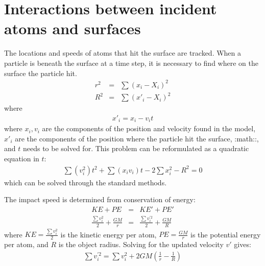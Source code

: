 \documentclass[letterpaper,10pt,english]{sphinxmanual}
\begin{document}
\section{Interactions between incident atoms and surfaces}
\label{\detokenize{nexoclom2/surface_interaction:interactions-between-incident-atoms-and-surfaces}}\label{\detokenize{nexoclom2/surface_interaction::doc}}
\sphinxAtStartPar
The locations and speeds of atoms that hit the surface are tracked. When a
particle is beneath the surface at a time step, it is necessary to find where
on the surface the particle hit.
\begin{equation*}
\begin{split}r^2 & = & \sum (x_i - X_i)^2 \\
R^2 & = & \sum (x'_i - X_i)^2\end{split}
\end{equation*}
\sphinxAtStartPar
where
\begin{equation*}
\begin{split}x'_i = x_i - v_i t\end{split}
\end{equation*}
\sphinxAtStartPar
where \(x_i, v_i\) are the components of the position and velocity found
in the model, \(x'_i\) are the components of the position where the
particle hit the surface, :math::, and \(t\) needs to be solved for. This problem
can be reformulated as a quadratic equation in \(t\):
\begin{equation*}
\begin{split}\sum(v_i^2) t^2 + \sum(x_i v_i)t - 2\sum x_i^2 - R^2 = 0\end{split}
\end{equation*}
\sphinxAtStartPar
which can be solved through the standard methods.

\sphinxAtStartPar
The impact speed is determined from conservation of energy:
\begin{equation*}
\begin{split}KE + PE & = & KE' + PE' \\
\frac{\sum v_i^2}{2} + \frac{GM}{r} & = & \frac{\sum v_i^{'2}}{2} + \frac{GM}{R}\end{split}
\end{equation*}
\sphinxAtStartPar
where \(KE = \frac{\sum v_i^2}{2}\) is the kinetic energy per atom,
\(PE = \frac{GM}{r}\) is the potential energy per atom, and \(R\) is the
object radius. Solving for the updated velocity \(v'\) gives:
\begin{equation*}
\begin{split}\sum v_i^{'2} = \sum v_i^2 + 2 G M \left(\frac{1}{r} - \frac{1}{R} \right)\end{split}
\end{equation*}
\sphinxstepscope
\end{document}
